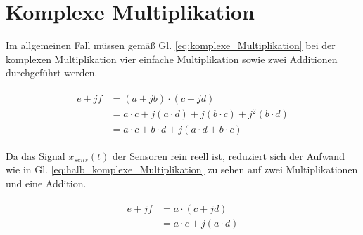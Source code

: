 \section{Komplexe Multiplikation}

Im allgemeinen Fall müssen gemäß Gl. \ref{eq:komplexe_Multiplikation} bei der komplexen Multiplikation vier einfache Multiplikation sowie zwei Additionen durchgeführt werden.

\begin{align}\label{eq:komplexe_Multiplikation}
\begin{split}
 e + jf &= (a + jb) \cdot (c + jd)\\
        &= a \cdot c + j(a \cdot d) + j(b \cdot c) + j^2(b \cdot d)\\
        &= a \cdot c + b \cdot d + j(a \cdot d + b \cdot c)
\end{split}
\end{align}


Da das Signal $x_{sens}(t)$ der Sensoren rein reell ist, reduziert sich der Aufwand wie in Gl. \ref{eq:halb_komplexe_Multiplikation} zu sehen auf zwei Multiplikationen und eine Addition.

\begin{align}\label{eq:halb_komplexe_Multiplikation}
\begin{split}
 e + jf &= a \cdot (c + jd)\\
        &= a \cdot c + j(a \cdot d)\\
\end{split}
\end{align}